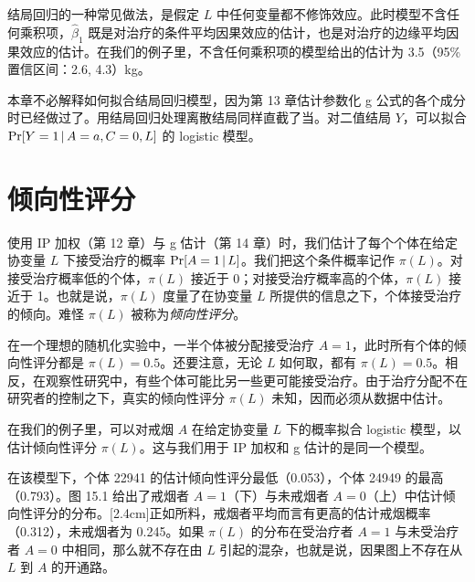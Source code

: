 结局回归的一种常见做法，是假定 $L$ 中任何变量都不修饰效应。此时模型不含任何乘积项，$\hat\beta_1$ 既是对治疗的条件平均因果效应的估计，也是对治疗的边缘平均因果效应的估计。在我们的例子里，不含任何乘积项的模型给出的估计为 3.5（95\% 置信区间：2.6, 4.3）kg。

本章不必解释如何拟合结局回归模型，因为第 13 章估计参数化 g 公式的各个成分时已经做过了。用结局回归处理离散结局同样直截了当。对二值结局 $Y$，可以拟合 $\Pr[Y=1\,|\, A=a,C=0,L]$ 的 logistic 模型。

\section{倾向性评分}

使用 IP 加权（第 12 章）与 g 估计（第 14 章）时，我们估计了每个个体在给定协变量 $L$ 下接受治疗的概率 $\Pr[A=1\,|\, L]$。我们把这个条件概率记作 $\pi(L)$。对接受治疗概率低的个体，$\pi(L)$ 接近于 0；对接受治疗概率高的个体，$\pi(L)$ 接近于 1。也就是说，$\pi(L)$ 度量了在协变量 $L$ 所提供的信息之下，个体接受治疗的倾向。难怪 $\pi(L)$ 被称为\emph{倾向性评分}。

在一个理想的随机化实验中，一半个体被分配接受治疗 $A=1$，此时所有个体的倾向性评分都是 $\pi(L)=0.5$。还要注意，无论 $L$ 如何取，都有 $\pi(L)=0.5$。相反，在观察性研究中，有些个体可能比另一些更可能接受治疗。由于治疗分配不在研究者的控制之下，真实的倾向性评分 $\pi(L)$ 未知，因而必须从数据中估计。

在我们的例子里，可以对戒烟 $A$ 在给定协变量 $L$ 下的概率拟合 logistic 模型，以估计倾向性评分 $\pi(L)$。这与我们用于 IP 加权和 g 估计的是同一个模型。

在该模型下，个体 22941 的估计倾向性评分最低（0.053），个体 24949 的最高（0.793）。图 15.1 给出了戒烟者 $A=1$（下）与未戒烟者 $A=0$（上）中估计倾向性评分的分布。[2.4cm]正如所料，戒烟者平均而言有更高的估计戒烟概率（0.312），未戒烟者为 0.245。如果 $\pi(L)$ 的分布在受治疗者 $A=1$ 与未受治疗者 $A=0$ 中相同，那么就不存在由 $L$ 引起的混杂，也就是说，因果图上不存在从 $L$ 到 $A$ 的开通路。

